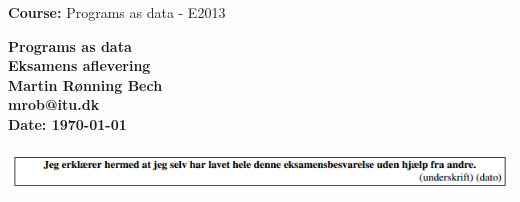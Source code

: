 \documentclass[a4paper,11pt]{article}
\begin{document}

\begin{titlepage}
\begin{flushleft}
\textbf{Course:} Programs as data - E2013
\end{flushleft}
\vspace{30mm}
\centering \parindent=0pt
\Huge\bfseries
Programs as data\\[0.7cm]
\large Eksamens aflevering\\
\vspace{20mm}
    Martin Rønning Bech 
\\  mrob@itu.dk\\
\vspace{50mm}
Date: \today

\vspace{50mm}
\includegraphics[width=1.1\textwidth]{formal/sign.png}

\end{titlepage}


\end{document}
